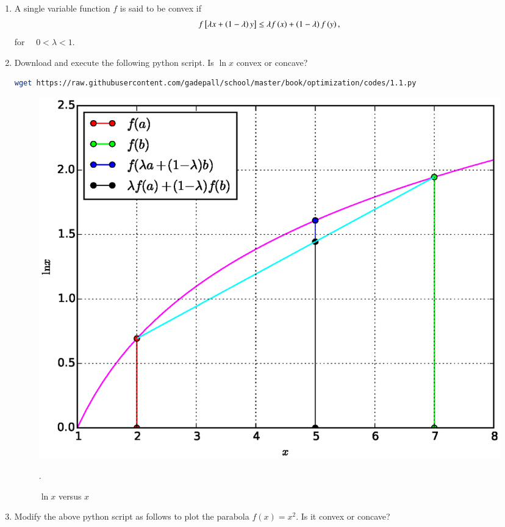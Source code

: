 \renewcommand{\theequation}{\theenumi}

\begin{enumerate}[label=\arabic*.,ref=\thesubsection.\theenumi]

\item A single variable function $f$ is said to be convex if
%
\begin{align}
\label{ch1_convex_def}
f{}\left[\lambda x + \left(1-\lambda\right)y\right] \leq \lambda f\left(x\right) + \left(1-\lambda\right)f\left(y\right), 
\end{align}
%
for $\quad 0 < \lambda < 1$.


\item
Download and execute the following python script. Is  $\ln x$ convex or  concave?

%
\begin{lstlisting}[language=sh]
wget https://raw.githubusercontent.com/gadepall/school/master/book/optimization/codes/1.1.py
\end{lstlisting}
%
\begin{figure}[!ht]
\centering
\includegraphics[width=\columnwidth]{./optimization/figs/1.1.eps}
\caption{ $\ln x$ versus $x$}.
\label{fig.1.1}	
\end{figure}
%
\item
Modify the above python script as follows to plot the parabola $f(x) = x^2$. Is it convex or concave?


\end{enumerate}
